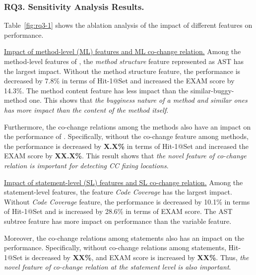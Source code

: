 \subsubsection{\bf RQ3. Sensitivity Analysis Results.}\label{sensi}

Table~\ref{fig:rq3-1} shows the ablation analysis of the
impact of different features on performance. 

\underline{Impact of method-level (ML) features and ML co-change relation.}
Among the method-level features of {\tool}, the {\it method structure}
feature represented as AST has the largest impact. Without the method
structure feature, the performance is decreased by 7.8\% in terms of
Hit-1@Set and increased the EXAM score by 14.3\%. The method content
feature has less impact than the similar-buggy-method one. This
shows that {\em the bugginess nature of a method and similar ones has
more impact than the content of the method itself}.


Furthermore, the co-change relations among the methods also have an
impact on the performance of {\tool}. Specifically, without the
co-change feature among methods, the performance is decreased by {\bf
X.X\%} in terms of Hit-1@Set and increased the EXAM score by {\bf
XX.X\%}. This result shows that {\em the novel feature of co-change
relation is important for detecting CC fixing locations}.


\underline{Impact of statement-level (SL) features and SL co-change relation.}
Among the statement-level features, the feature {\it Code Coverage}
has the largest impact. Without {\it Code Coverage} feature, the
performance is decreased by 10.1\% in terms of Hit-1@Set and is
increased by 28.6\% in terms of EXAM score. The AST subtree feature
has more impact on performance than the variable feature.

Moreover, the co-change relations among statements also has an impact
on the performance. Specifically, without co-change relations among
statements, Hit-1@Set is decreased by {\bf XX\%}, and EXAM score is
increased by {\bf XX\%}. Thus, {\em the novel feature of co-change
relation at the statement level is also important}.


